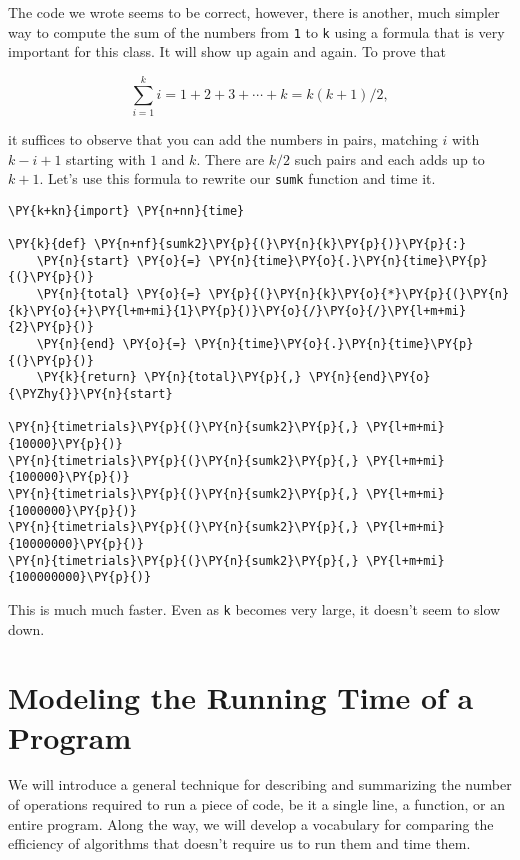 The code we wrote seems to be correct, however, there is another, much simpler way to compute the sum of the numbers from \texttt{1} to \texttt{k} using a formula that is very important for this class.
It will show up again and again.
To prove that


\[
\sum_{i = 1}^k i = 1 + 2 + 3 + \cdots + k = k (k + 1) / 2,
\]


it suffices to observe that you can add the numbers in pairs, matching $i$ with $k-i + 1$ starting with $1$ and $k$.
There are $k/2$ such pairs and each adds up to $k+1$.
Let's use this formula to rewrite our \texttt{sumk} function and time it.

\begin{Verbatim}[commandchars=\\\{\}]
\PY{k+kn}{import} \PY{n+nn}{time}

\PY{k}{def} \PY{n+nf}{sumk2}\PY{p}{(}\PY{n}{k}\PY{p}{)}\PY{p}{:}
    \PY{n}{start} \PY{o}{=} \PY{n}{time}\PY{o}{.}\PY{n}{time}\PY{p}{(}\PY{p}{)}
    \PY{n}{total} \PY{o}{=} \PY{p}{(}\PY{n}{k}\PY{o}{*}\PY{p}{(}\PY{n}{k}\PY{o}{+}\PY{l+m+mi}{1}\PY{p}{)}\PY{o}{/}\PY{o}{/}\PY{l+m+mi}{2}\PY{p}{)}
    \PY{n}{end} \PY{o}{=} \PY{n}{time}\PY{o}{.}\PY{n}{time}\PY{p}{(}\PY{p}{)}
    \PY{k}{return} \PY{n}{total}\PY{p}{,} \PY{n}{end}\PY{o}{\PYZhy{}}\PY{n}{start}

\PY{n}{timetrials}\PY{p}{(}\PY{n}{sumk2}\PY{p}{,} \PY{l+m+mi}{10000}\PY{p}{)}
\PY{n}{timetrials}\PY{p}{(}\PY{n}{sumk2}\PY{p}{,} \PY{l+m+mi}{100000}\PY{p}{)}
\PY{n}{timetrials}\PY{p}{(}\PY{n}{sumk2}\PY{p}{,} \PY{l+m+mi}{1000000}\PY{p}{)}
\PY{n}{timetrials}\PY{p}{(}\PY{n}{sumk2}\PY{p}{,} \PY{l+m+mi}{10000000}\PY{p}{)}
\PY{n}{timetrials}\PY{p}{(}\PY{n}{sumk2}\PY{p}{,} \PY{l+m+mi}{100000000}\PY{p}{)}
\end{Verbatim}



This is much much faster.
Even as \texttt{k} becomes very large, it doesn't seem to slow down.

\section{Modeling the Running Time of a Program}


We will introduce a general technique for describing and summarizing the number of operations required to run a piece of code, be it a single line, a function, or an entire program.
Along the way, we will develop a vocabulary for comparing the efficiency of algorithms that doesn't require us to run them and time them.


